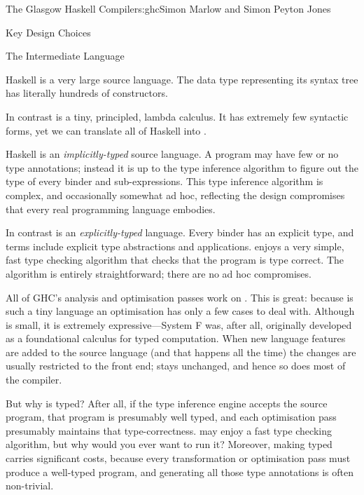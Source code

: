 \begin{aosachapter}{The Glasgow Haskell Compiler}{s:ghc}{Simon Marlow and Simon Peyton Jones}
\begin{aosasect1}{Key Design Choices}
\begin{aosasect2}{The Intermediate Language}
\begin{aosaitemize}

\item Haskell is a very large source language.  The data type
  representing its syntax tree has literally hundreds of constructors.

  In contrast  is a tiny, principled, lambda calculus.  It has
  extremely few syntactic forms, yet we can translate all of Haskell
  into .

\item Haskell is an \emph{implicitly-typed} source language.  A
  program may have few or no type annotations; instead it is up to the
  type inference algorithm to figure out the type of every binder and
  sub-expressions.  This type inference algorithm is complex, and
  occasionally somewhat ad hoc, reflecting the design
  compromises that every real programming language embodies.

  In contrast  is an \emph{explicitly-typed} language.  Every
  binder has an explicit type, and terms include explicit type
  abstractions and applications.   enjoys a very simple, fast
  type checking algorithm that checks that the program is type
  correct.  The algorithm is entirely straightforward; there are no
  ad hoc compromises.

\end{aosaitemize}

All of GHC's analysis and optimisation passes work on . This is
great: because  is such a tiny language an optimisation has
only a few cases to deal with.  Although  is small, it is
extremely expressive---System F was, after all, originally developed
as a foundational calculus for typed computation.  When new language
features are added to the source language (and that happens all the
time) the changes are usually restricted to the front end; 
stays unchanged, and hence so does most of the compiler.

But why is  typed?  After all, if the type inference engine
accepts the source program, that program is presumably well typed, and
each optimisation pass presumably maintains that type-correctness.
 may enjoy a fast type checking algorithm, but why would you
ever want to run it?  Moreover, making  typed carries
significant costs, because every transformation or optimisation pass
must produce a well-typed program, and generating all those type
annotations is often non-trivial.


\end{aosasect2}
\end{aosasect1}
\end{aosachapter}
